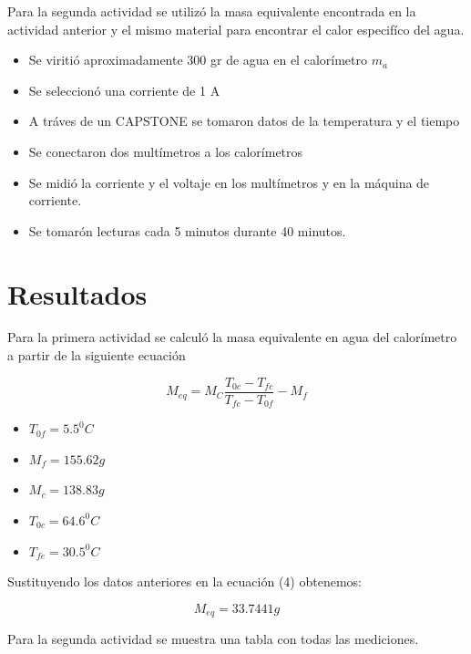 \documentclass[12pt]{article}
\begin{document}
Para la segunda actividad se utilizó la masa equivalente encontrada en la actividad anterior y el mismo
material para encontrar el calor especifíco del agua.
\begin{itemize}
\item Se viritió aproximadamente 300 gr de agua en el calorímetro $m_{a}$
\item Se seleccionó una corriente de 1 A \item A tráves de un CAPSTONE se tomaron datos de la temperatura y el tiempo
\item Se conectaron dos multímetros a los calorímetros
\item Se midió la corriente y el voltaje en los multímetros y en la máquina de corriente.
\item Se tomarón lecturas cada 5 minutos durante 40 minutos.
\end{itemize}


\section{Resultados}
Para la primera actividad se calculó la masa equivalente en agua del calorímetro a partir de la siguiente ecuación

\begin{equation}
M_{eq} = M_C \frac{T_{0c} - T_{fc} }{T_{fc} - T_{0f}} - M_f
\end{equation}

\begin{itemize}
\item $T_{0f} = 5.5 ^0 C$
\item $M_{f} = 155.62  g$
\item $M_{c} = 138.83 g$
\item $T_{0c} = 64.6 ^0 C$
\item $T_{fe} = 30.5 ^0 C$
\end{itemize}


Sustituyendo los datos anteriores en la ecuación (4) obtenemos:

$$M_{eq} = 33.7441 g$$

Para la segunda actividad se muestra una tabla con todas las mediciones.
\end{document}
